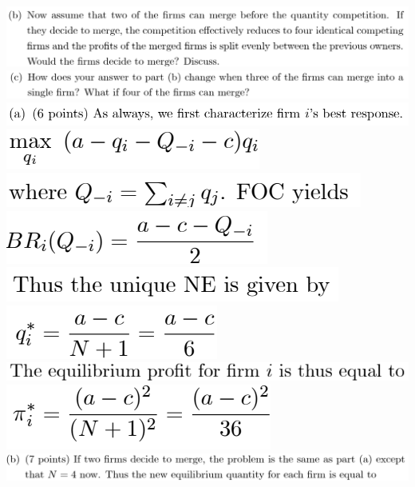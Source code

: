 \documentclass[8pt,landscape]{extarticle}
\begin{document}
\begin{multicols*}{3}
    \includegraphics[width=0.74\linewidth,keepaspectratio]{Screenshots/Screenshot 2024-03-11 134430.png}
    \includegraphics[width=0.75\linewidth,keepaspectratio]{Screenshots/Screenshot 2024-03-11 134435.png}
    \includegraphics[width=0.58\linewidth,keepaspectratio]{Screenshots/Screenshot 2024-03-11 134459.png}
    \includegraphics[width=0.21\linewidth,keepaspectratio]{Screenshots/Screenshot 2024-03-11 134502.png}
    \includegraphics[width=0.3\linewidth,keepaspectratio]{Screenshots/Screenshot 2024-03-11 134507.png}
    \includegraphics[width=0.22\linewidth,keepaspectratio]{Screenshots/Screenshot 2024-03-11 134515.png}
    \includegraphics[width=0.28\linewidth,keepaspectratio]{Screenshots/Screenshot 2024-03-11 134518.png}
    \includegraphics[width=0.18\linewidth,keepaspectratio]{Screenshots/Screenshot 2024-03-11 134524.png}
    \includegraphics[width=0.41\linewidth,keepaspectratio]{Screenshots/Screenshot 2024-03-11 134533.png}
    \includegraphics[width=0.22\linewidth,keepaspectratio]{Screenshots/Screenshot 2024-03-11 134542.png}
    \includegraphics[width=0.74\linewidth,keepaspectratio]{Screenshots/Screenshot 2024-03-11 134551.png}

\end{multicols*}
\end{document}
